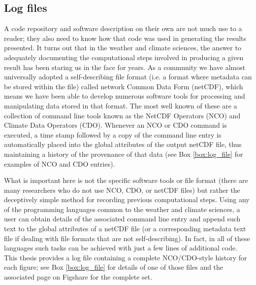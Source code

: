 \subsection{Log files}\label{s:log_files}

A code repository and software description on their own are not much use to a reader; they also need to know how that code was used in generating the results presented. It turns out that in the weather and climate sciences, the answer to adequately documenting the computational steps involved in producing a given result has been staring us in the face for years. As a community we have almost universally adopted a self-describing file format (i.e. a format where metadata can be stored within the file) called network Common Data Form (netCDF), which means we have been able to develop numerous software tools for processing and manipulating data stored in that format. The most well known of these are a collection of command line tools known as the NetCDF Operators (NCO) and Climate Data Operators (CDO). Whenever an NCO or CDO command is executed, a time stamp followed by a copy of the command line entry is automatically placed into the global attributes of the output netCDF file, thus maintaining a history of the provenance of that data (see Box \ref{box:log_file} for examples of NCO and CDO entries).

What is important here is not the specific software tools or file format (there are many researchers who do not use NCO, CDO, or netCDF files) but rather the deceptively simple method for recording previous computational steps. Using any of the programming languages common to the weather and climate sciences, a user can obtain details of the associated command line entry and append such text to the global attributes of a netCDF file (or a corresponding metadata text file if dealing with file formats that are not self-describing). In fact, in all of these languages such tasks can be achieved with just a few lines of additional code. This thesis provides a log file containing a complete NCO/CDO-style history for each figure; see Box \ref{box:log_file} for details of one of those files and the associated page on Figshare for the complete set.

